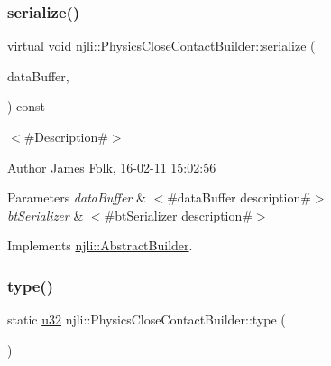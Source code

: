 \subsubsection{\texorpdfstring{serialize()}{serialize()}}
{\footnotesize\ttfamily virtual \mbox{\hyperlink{_thread_8h_af1e856da2e658414cb2456cb6f7ebc66}{void}} njli\+::\+Physics\+Close\+Contact\+Builder\+::serialize (\begin{DoxyParamCaption}\item[{\mbox{\hyperlink{_thread_8h_af1e856da2e658414cb2456cb6f7ebc66}{void}} $\ast$}]{data\+Buffer,  }\item[{bt\+Serializer $\ast$}]{ }\end{DoxyParamCaption}) const\hspace{0.3cm}{\ttfamily [virtual]}}



$<$\#\+Description\#$>$ 

\begin{DoxyAuthor}{Author}
James Folk, 16-\/02-\/11 15\+:02\+:56
\end{DoxyAuthor}

\begin{DoxyParams}{Parameters}
{\em data\+Buffer} & $<$\#data\+Buffer description\#$>$ \\
\hline
{\em bt\+Serializer} & $<$\#bt\+Serializer description\#$>$ \\
\hline
\end{DoxyParams}


Implements \mbox{\hyperlink{classnjli_1_1_abstract_builder_ab66b774e02ccb9da554c9aab7fa6d981}{njli\+::\+Abstract\+Builder}}.

\mbox{\label{classnjli_1_1_physics_close_contact_builder_a7dc46e313576f83c2297da3094b85918}} 
\subsubsection{\texorpdfstring{type()}{type()}}
{\footnotesize\ttfamily static \mbox{\hyperlink{_util_8h_a10e94b422ef0c20dcdec20d31a1f5049}{u32}} njli\+::\+Physics\+Close\+Contact\+Builder\+::type (\begin{DoxyParamCaption}{ }\end{DoxyParamCaption})\hspace{0.3cm}{\ttfamily [static]}}

